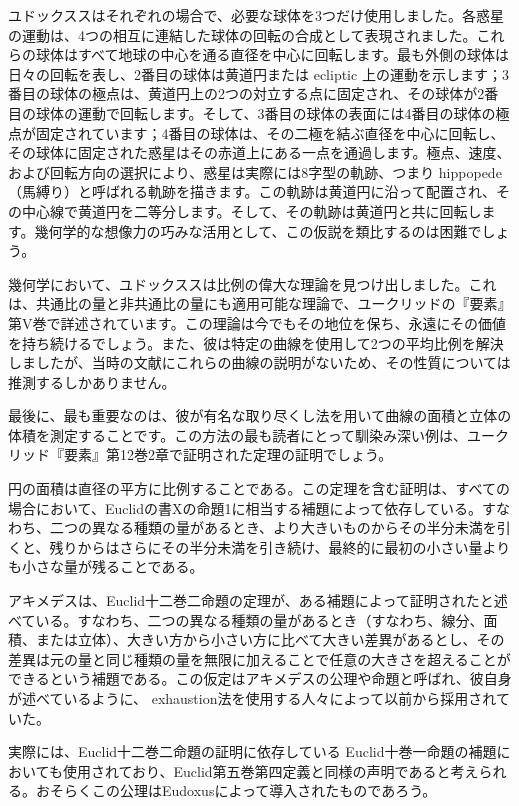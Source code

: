 \documentclass[a4paper,11pt,openany]{ltjsbook}
\begin{document}
ユドックススはそれぞれの場合で、必要な球体を3つだけ使用しました。各惑星の運動は、4つの相互に連結した球体の回転の合成として表現されました。これらの球体はすべて地球の中心を通る直径を中心に回転します。最も外側の球体は日々の回転を表し、2番目の球体は黄道円または ecliptic 上の運動を示します；3番目の球体の極点は、黄道円上の2つの対立する点に固定され、その球体が2番目の球体の運動で回転します。そして、3番目の球体の表面には4番目の球体の極点が固定されています；4番目の球体は、その二極を結ぶ直径を中心に回転し、その球体に固定された惑星はその赤道上にある一点を通過します。極点、速度、および回転方向の選択により、惑星は実際には8字型の軌跡、つまり hippopede（馬縛り）と呼ばれる軌跡を描きます。この軌跡は黄道円に沿って配置され、その中心線で黄道円を二等分します。そして、その軌跡は黄道円と共に回転します。幾何学的な想像力の巧みな活用として、この仮説を類比するのは困難でしょう。

幾何学において、ユドックススは比例の偉大な理論を見つけ出しました。これは、共通比の量と非共通比の量にも適用可能な理論で、ユークリッドの『要素』第V巻で詳述されています。この理論は今でもその地位を保ち、永遠にその価値を持ち続けるでしょう。また、彼は特定の曲線を使用して2つの平均比例を解決しましたが、当時の文献にこれらの曲線の説明がないため、その性質については推測するしかありません。

最後に、最も重要なのは、彼が有名な取り尽くし法を用いて曲線の面積と立体の体積を測定することです。この方法の最も読者にとって馴染み深い例は、ユークリッド『要素』第12巻2章で証明された定理の証明でしょう。

円の面積は直径の平方に比例することである。この定理を含む証明は、すべての場合において、Euclidの書Xの命題1に相当する補題によって依存している。すなわち、二つの異なる種類の量があるとき、より大きいものからその半分未満を引くと、残りからはさらにその半分未満を引き続け、最終的に最初の小さい量よりも小さな量が残ることである。

アキメデスは、Euclid十二巻二命題の定理が、ある補題によって証明されたと述べている。すなわち、二つの異なる種類の量があるとき（すなわち、線分、面積、または立体）、大きい方から小さい方に比べて大きい差異があるとし、その差異は元の量と同じ種類の量を無限に加えることで任意の大きさを超えることができるという補題である。この仮定はアキメデスの公理や命題と呼ばれ、彼自身が述べているように、 exhaustion法を使用する人々によって以前から採用されていた。

実際には、Euclid十二巻二命題の証明に依存している Euclid十巻一命題の補題においても使用されており、Euclid第五巻第四定義と同様の声明であると考えられる。おそらくこの公理はEudoxusによって導入されたものであろう。
\end{document}
